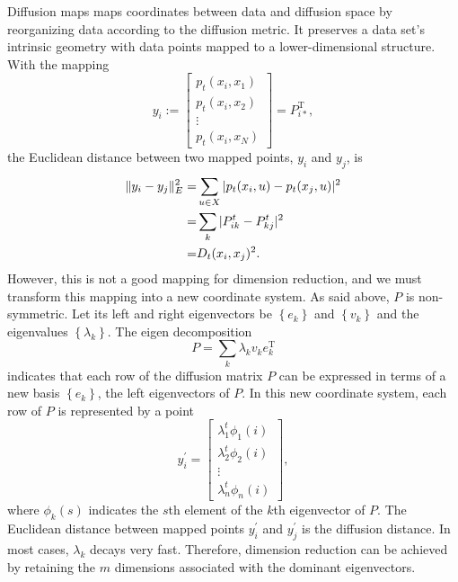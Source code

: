 Diffusion maps maps coordinates between data and diffusion space by reorganizing data according to the diffusion metric. It preserves a data set's intrinsic geometry with data points mapped to a lower-dimensional structure. With the mapping 
\begin{equation}
	y_i := \begin{bmatrix}
		p_t(x_i, x_{1}) \\
		p_t(x_i, x_{2}) \\
		\vdots \\
		p_t(x_i, x_{N})
	\end{bmatrix}=P_{i\ast}^{\operatorname{T}},
\end{equation}
the Euclidean distance between two mapped points, $y_i$ and $y_j$, is
\begin{align}
	\lVert y_i-y_j\rVert_E^2=&\sum_{u\in X} |p_t(x_i,u)-p_t(x_j,u)|^2\notag\\
	                        =&\sum_k |P_{ik}^t-P_{kj}^t|^2\notag\\
	                        =&D_t(x_i,x_j)^2.
\end{align}
However, this is not a good mapping for dimension reduction, and we must transform this mapping into a new coordinate system. As said above, $P$ is non-symmetric. Let its left and right eigenvectors be $\left\{e_k\right\}$ and $\left\{v_k\right\}$ and the eigenvalues $\left\{\lambda_k\right\}$. The eigen decomposition
\begin{equation}
	P=\sum_k\lambda_kv_ke_k^{\operatorname{T}}
\end{equation}
indicates that each row of the diffusion matrix $P$ can be expressed in terms of a new basis $\left\{e_k\right\}$, the left eigenvectors of $P$. In this new coordinate system, each row of $P$ is represented by a point
\begin{equation}
	y_i^\prime=\begin{bmatrix}
		\lambda_1^t\phi_1(i) \\
		\lambda_2^t\phi_2(i) \\
		\vdots \\
		\lambda_n^t\phi_n(i)
	\end{bmatrix},
\end{equation}
where $\phi_k(s)$ indicates the $s$th element of the $k$th eigenvector of $P$. The Euclidean distance between mapped points $y_i^\prime$ and $y_j^\prime$ is the diffusion distance. In most cases, $\lambda_k$ decays very fast. Therefore, dimension reduction can be achieved by retaining the $m$ dimensions associated with the dominant eigenvectors.